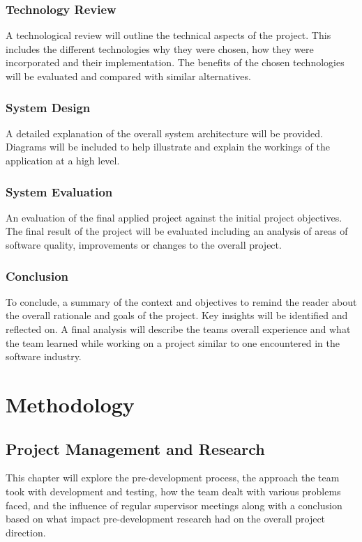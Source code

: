 \subsection{Technology Review}
A technological review will outline the technical aspects of the project. This includes the different technologies why they were chosen, how they were incorporated and their implementation. The benefits of the chosen technologies will be evaluated and compared with similar alternatives.

\subsection{System Design}
A detailed explanation of the overall system architecture will be provided. Diagrams will be included to help illustrate and explain the workings of the application at a high level.

\subsection{System Evaluation}
An evaluation of the final applied project against the initial project objectives. The final result of the project will be evaluated including an analysis of areas of software quality, improvements or changes to the overall project.

\subsection{Conclusion}
To conclude, a summary of the context and objectives to remind the reader about the overall rationale and goals of the project. Key insights will be identified and reflected on. A final analysis will describe the teams overall experience and what the team learned while working on a project similar to one encountered in the software industry.

\chapter{Methodology}
\section{Project Management and Research}
This chapter will explore the pre-development process, the approach the team took with development and testing, how the team dealt with various problems faced, and the influence of regular supervisor meetings along with a conclusion based on what impact pre-development research had on the overall project direction.

